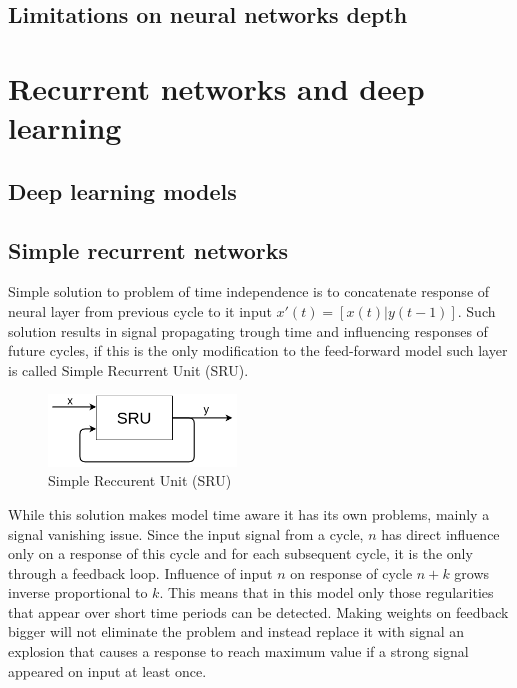 \subsection{Limitations on neural networks depth}


\section{Recurrent networks and deep learning}

\subsection{Deep learning models}

\subsection{Simple recurrent networks}
Simple solution to problem of time independence is to concatenate response of neural layer
from previous cycle to it input $x'(t)=[x(t)|y(t-1)]$.
Such solution results in signal propagating trough time and influencing responses of future cycles,
if this is the only modification to the feed-forward model such layer is called Simple Recurrent
Unit (SRU).
\begin{figure}[h] 
	\centering
	\includegraphics[width=5cm]{res/sru}
	\caption{Simple Reccurent Unit (SRU)}
	\label{fig:sru}
\end{figure}
While this solution makes model time aware it has its own problems, mainly a signal vanishing
issue. Since the input signal from a cycle, $n$ has direct influence only on a response of this
cycle and for each subsequent cycle, it is the only through a feedback loop.
Influence of input $n$ on response of cycle $n+k$ grows inverse proportional to $k$.
This means that in this model only those regularities that appear over short time periods can
be detected.
Making weights on feedback bigger will not eliminate the problem and instead replace it with signal
an explosion that causes a response to reach maximum value if a strong signal appeared on input at
least once.

